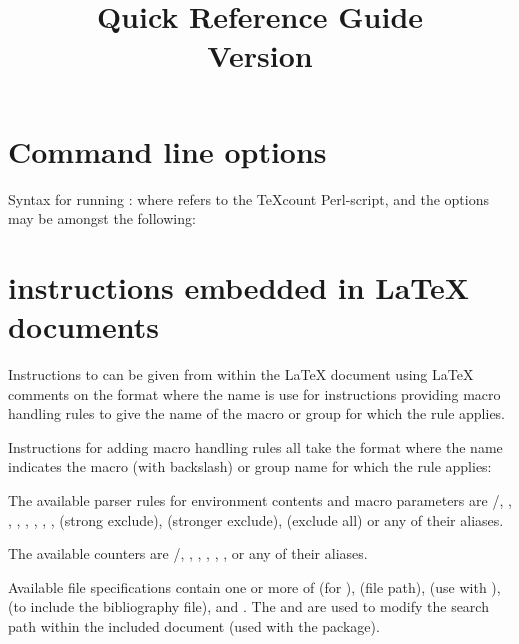 \documentclass{article}
\title{%
\TeXcount{} Quick Reference Guide\\
Version \version\copyrightfootnote
}
\begin{document}
\maketitle

\section{Command line options}

Syntax for running \TeXcount{}:
where  refers to the TeXcount Perl-script, and the options may be amongst the following:




\section{\TeXcount{} instructions embedded in \LaTeX{} documents}

Instructions to \TeXcount{} can be given from within the
\LaTeX{} document using \LaTeX{} comments on the format
where the name is use for instructions providing macro handling rules to give the name of the macro or group for which the rule applies.
%


Instructions for adding macro handling rules all take the format
where the name indicates the macro (with backslash) or group name for which the rule applies:
%


The available parser rules for environment contents and macro parameters are /, , , , , , , ,  (strong exclude),  (stronger exclude),  (exclude all) or any of their aliases.

The available counters are /, , , , , ,  or any of their aliases.

Available file specifications contain one or more of  (for ),  (file path),  (use with ),  (to include the bibliography file),  and . The  and  are used to modify the search path within the included document (used with the  package).
\end{document}
